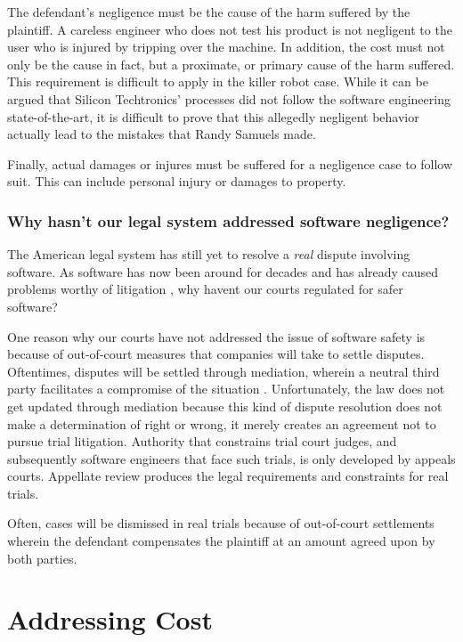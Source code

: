 \documentclass[12pt]{report}
\begin{document}
The defendant's negligence must be the cause of the harm suffered by the plaintiff. A careless engineer who does not test his product is not negligent to the user who is injured by tripping over the machine. In addition, the cost must not only be the cause in fact, but a proximate, or primary cause of the harm suffered. This requirement is difficult to apply in the killer robot case. While it can be argued that Silicon Techtronics' processes did not follow the software engineering state-of-the-art, it is difficult to prove that this allegedly negligent behavior actually lead to the mistakes that Randy Samuels made. 

Finally, actual damages or injures must be suffered for a negligence case to follow suit. This can include personal injury or damages to property. 

\subsubsection{Why hasn't our legal system addressed software negligence?}  

The American legal system has still yet to resolve a \textit{real} dispute involving software. As software has now been around for decades and has already caused problems worthy of litigation \cite{FAKE}, why havent our courts regulated for safer software?  

One reason why our courts have not addressed the issue of software safety is because of out-of-court measures that companies will take to settle disputes. Oftentimes, disputes will be settled through mediation, wherein a neutral third party facilitates a compromise of the situation \cite{FAKE}. Unfortunately, the law does not get updated through mediation because this kind of dispute resolution does not make a determination of right or wrong, it merely creates an agreement not to pursue trial litigation. Authority that constrains trial court judges, and subsequently software engineers that face such trials, is only developed by appeals courts. Appellate review produces the legal requirements and constraints for real trials.  

Often, cases will be dismissed in real trials because of out-of-court settlements wherein the defendant compensates the plaintiff at an amount agreed upon by both parties. 

\section{Addressing Cost} 
\end{document}
